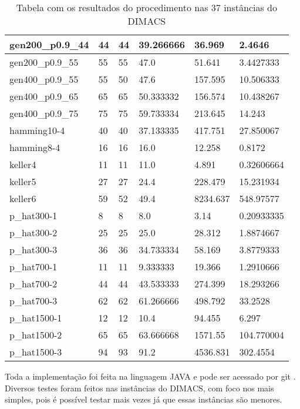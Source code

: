 \documentclass{article}
\begin{document}
\begin{center}
\begin{table}
\begin{tabular}{| l | l | l | l | l | l |}
gen200\_p0.9\_44	&	44			&44			&39.266666		&36.969		&2.4646	\\ \hline
gen200\_p0.9\_55	&	55			&55			&47.0			&51.641		&3.4427333\\ \hline
gen400\_p0.9\_55	&	55			&50			&47.6			&157.595	&10.506333\\ \hline
gen400\_p0.9\_65	&	65			&65			&50.333332		&156.574	&10.438267\\ \hline
gen400\_p0.9\_75	&	75			&75			&59.733334		&213.645	&14.243\\ \hline
hamming10-4		&	40			&40			&37.133335		&417.751	&27.850067\\ \hline
hamming8-4			&	16			&16			&16.0			&12.258		&0.8172\\ \hline
keller4				&	11			&11			&11.0			&4.891		&0.32606664\\ \hline
keller5				&	27			&27			&24.4			&228.479	&15.231934\\ \hline
keller6				&	59			&52			&49.4			&8234.637	&548.97577\\ \hline
p\_hat300-1			&	8			&8 			&8.0			&3.14		&0.20933335\\ \hline
p\_hat300-2			&	25			&25			&25.0			&28.312		&1.8874667\\ \hline
p\_hat300-3			&	36			&36			&34.733334		&58.169		&3.8779333\\ \hline
p\_hat700-1			&	11			&11			&9.333333		&19.366		&1.2910666\\ \hline
p\_hat700-2			&	44			&44			&43.533333		&274.399	&18.293266\\ \hline
p\_hat700-3			&	62			&62			&61.266666		&498.792	&33.2528\\ \hline
p\_hat1500-1		&	12			&12			&10.4			&94.455		&6.297\\ \hline
p\_hat1500-2		&	65			&65			&63.666668		&1571.55	&104.770004\\ \hline
p\_hat1500-3		&	94			&93			&91.2			&4536.831	&302.4554\\ \hline
    \hline
\end{tabular}
\caption{Tabela com os resultados do procedimento nas 37 instâncias do DIMACS}
\end{table}
\end{center}

Toda a implementação foi feita na linguagem JAVA e pode ser acessado por git \cite{git}. Diversos testes foram feitos nas instâncias do DIMACS, com foco nos mais simples, pois é possível testar mais vezes já que essas instâncias são menores.\par
\end{document}
